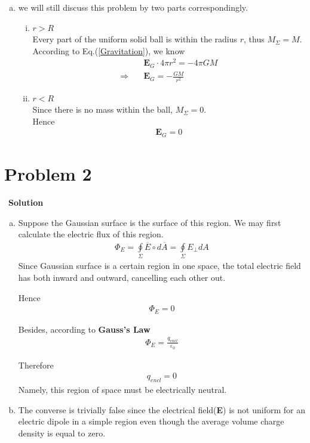 \documentclass[12pt,a4paper]{article}
\begin{document}
\begin{enumerate}[(a)]
    \item we will still discuss this problem by two parts correspondingly.
\begin{enumerate}[i)]
    \item $r > R$ \\
    Every part of the uniform solid ball is within the radius $r$, thus $M_{\Sigma} = M$. \\
    According to Eq.(\ref{Gravitation}), we know
    \begin{align}
        &\mathbf{E}_{G} \cdot 4\pi r^2 = -4\pi GM \\
        \Rightarrow\quad &\mathbf{E}_{G} = -\frac{GM}{r^2}
    \end{align}
    
    \item $r < R$ \\
    Since there is no mass within the ball, $M_{\Sigma} = 0$. \\
    Hence
    \begin{align}
        \mathbf{E}_{G} = 0
    \end{align}
\end{enumerate}
\end{enumerate}

\section*{\large \textbf{Problem 2}}~{\textbf{Solution}}

\begin{enumerate}[(a)]
    \item Suppose the Gaussian surface is the surface of this region. We may first calculate the electric flux of this region.
    \begin{align}
        \Phi_E = \oint\limits_{\Sigma} \overline{E} \circ d\overline{A} = \oint\limits_{\Sigma} E_{\perp} dA
    \end{align}
    Since Gaussian surface is a certain region in one space, the total electric field has both inward and outward, cancelling each other out.
    
    Hence
    \begin{align}
        \Phi_E = 0
    \end{align}
    
    Besides, according to \textbf{Gauss's Law}
    \begin{align}
        \Phi_E = \frac{q_{encl}}{\varepsilon_0}
    \end{align}
    
    Therefore
    \begin{align}
        q_{encl} = 0
    \end{align}
    Namely, this region of space must be electrically neutral.
    
    \item The converse is trivially false since the electrical field(\textbf{E}) is not uniform for an electric dipole in a simple region even though the average volume charge density is equal to zero.
\end{enumerate}
\end{document}

